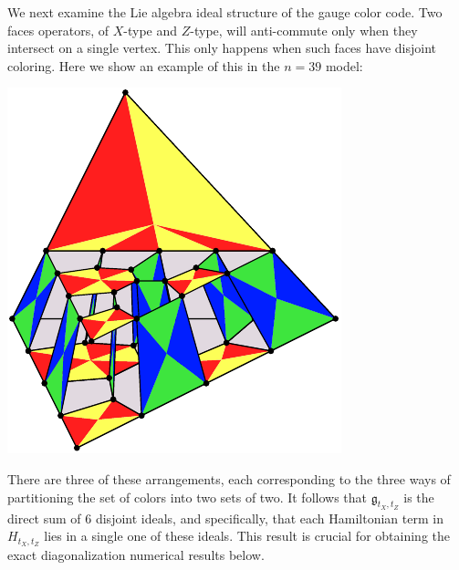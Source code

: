 \documentclass[11pt,oneside]{article}
\newcommand{\todo}[1]{\ \textcolor{red}{\{#1\}}\ }
\def\lie{\mathfrak{g}}
\begin{document}
We next examine the Lie algebra ideal structure of the gauge color code.
Two faces operators, of $X$-type and $Z$-type,
will anti-commute only when
they intersect on a single vertex.
This only happens when such faces have disjoint coloring.
Here we show an example of this in the $n=39$ model:
\begin{center}
\includegraphics{pic-gcolor-ideal.pdf}
\end{center}
There are three of these arrangements,
each corresponding to the three ways of
partitioning the set of colors into two sets of two.
It follows that $\lie_{t_X,t_Z}$ 
is the direct sum of 6 disjoint ideals,
and specifically, that each Hamiltonian term in $H_{t_X,t_Z}$
lies in a single one of these ideals.
This result is crucial for obtaining the exact
diagonalization numerical results below.




\end{document}
